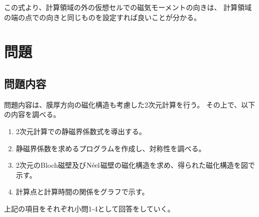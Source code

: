 \documentclass{jsarticle}
\begin{document}
この式より、計算領域の外の仮想セルでの磁気モーメントの向きは、
計算領域の端の点での向きと同じものを設定すれば良いことが分かる。

\section{問題}
\subsection{問題内容}
問題内容は、膜厚方向の磁化構造も考慮した2次元計算を行う。
その上で、以下の内容を調べる。
\begin{enumerate}
	\item 2次元計算での静磁界係数式を導出する。
	\item 静磁界係数を求めるプログラムを作成し、対称性を調べる。
	\item 2次元のBloch磁壁及び$\mathrm{N\Acute{e}el}$磁壁の磁化構造を求め、得られた磁化構造を図で示す。
	\item 計算点と計算時間の関係をグラフで示す。
\end{enumerate}
上記の項目をそれぞれ小問1-4として回答をしていく。
\end{document}
